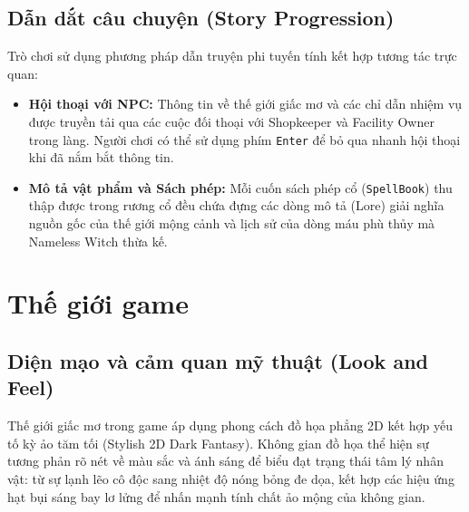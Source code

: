\documentclass[../DoAn.tex]{subfiles}
\begin{document}
\subsection{Dẫn dắt câu chuyện (Story Progression)}
Trò chơi sử dụng phương pháp dẫn truyện phi tuyến tính kết hợp tương tác trực quan:
\begin{itemize}
    \item \textbf{Hội thoại với NPC:} Thông tin về thế giới giấc mơ và các chỉ dẫn nhiệm vụ được truyền tải qua các cuộc đối thoại với Shopkeeper và Facility Owner trong làng. Người chơi có thể sử dụng phím \texttt{Enter} để bỏ qua nhanh hội thoại khi đã nắm bắt thông tin.
    \item \textbf{Mô tả vật phẩm và Sách phép:} Mỗi cuốn sách phép cổ (\texttt{SpellBook}) thu thập được trong rương cổ đều chứa đựng các dòng mô tả (Lore) giải nghĩa nguồn gốc của thế giới mộng cảnh và lịch sử của dòng máu phù thủy mà Nameless Witch thừa kế.
\end{itemize}

\section{Thế giới game}
\label{section:3.6}

\subsection{Diện mạo và cảm quan mỹ thuật (Look and Feel)}
Thế giới giấc mơ trong game áp dụng phong cách đồ họa phẳng 2D kết hợp yếu tố kỳ ảo tăm tối (Stylish 2D Dark Fantasy). Không gian đồ họa thể hiện sự tương phản rõ nét về màu sắc và ánh sáng để biểu đạt trạng thái tâm lý nhân vật: từ sự lạnh lẽo cô độc sang nhiệt độ nóng bỏng đe dọa, kết hợp các hiệu ứng hạt bụi sáng bay lơ lửng để nhấn mạnh tính chất ảo mộng của không gian.
\end{document}
